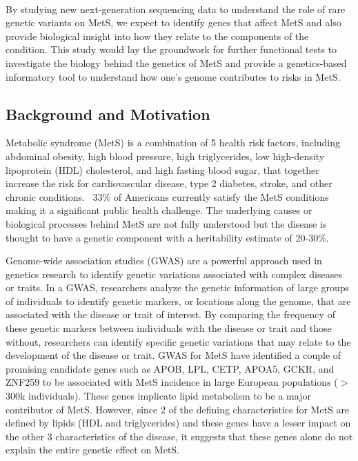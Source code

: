 \documentclass[11pt]{article}
\begin{document}
\

By studying new next-generation sequencing data to understand the role of rare genetic variants on MetS, we expect to identify genes that affect MetS and also provide biological insight into how they relate to the components of the condition. This study would lay the groundwork for further functional tests to investigate the biology behind the genetics of MetS and provide a genetics-based informatory tool to understand how one's genome contributes to risks in MetS.

\newpage

\subsection*{Background and Motivation}

Metabolic syndrome (MetS) is a combination of 5 health risk factors, including abdominal obesity, high blood pressure, high triglycerides, low high-density lipoprotein (HDL) cholesterol, and high fasting blood sugar, that together increase the risk for cardiovascular disease, type 2 diabetes, stroke, and other chronic conditions. ~33\% of Americans currently satisfy the MetS conditions making it a significant public health challenge. The underlying causes or biological processes behind MetS are not fully understood but the disease is thought to have a genetic component with a heritability estimate of 20-30\%. 

Genome-wide association studies (GWAS) are a powerful approach used in genetics research to identify genetic variations associated with complex diseases or traits. In a GWAS, researchers analyze the genetic information of large groups of individuals to identify genetic markers, or locations along the genome, that are associated with the disease or trait of interest. By comparing the frequency of these genetic markers between individuals with the disease or trait and those without, researchers can identify specific genetic variations that may relate to the development of the disease or trait. GWAS for MetS have identified a couple of promising candidate genes such as APOB, LPL, CETP, APOA5, GCKR, and ZNF259 to be associated with MetS incidence in large European populations ($>$300k individuals). These genes implicate lipid metabolism to be a major contributor of MetS. However, since 2 of the defining characteristics for MetS are defined by lipids (HDL and triglycerides) and these genes have a lesser impact on the other 3 characteristics of the disease, it suggests that these genes alone do not explain the entire genetic effect on MetS.
\end{document}
